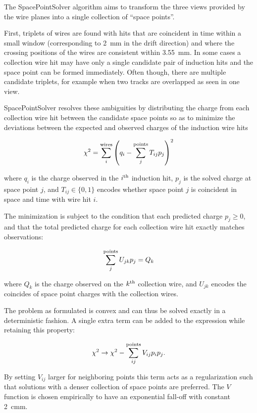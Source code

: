 The SpacePointSolver algorithm aims to transform the three \twod views provided by the wire planes into a single collection of \threed ``space points''.

First, triplets of wires are found with hits that are coincident in time within a small window (corresponding to \SI{2}{mm} in the drift direction) and where the crossing positions of the wires are consistent within \SI{3.55}{mm}. In some cases a collection wire hit may have only a single candidate pair of induction hits and the space point can be formed immediately. Often though, there are multiple candidate triplets, for example when two tracks are overlapped as seen in one view.

SpacePointSolver resolves these ambiguities by distributing the charge from each collection wire hit between the candidate space points so as to minimize the deviations between the expected and observed charges of the induction wire hits

\begin{equation}
\chi^2 = \sum_i^{\rm wires} \left(q_i - \sum_j^{\rm points}T_{ij}p_j\right)^2
\end{equation}

where $q_i$ is the charge observed in the $i^{\rm th}$ induction hit, $p_j$ is the solved charge at space point $j$, and $T_{ij}\in\{0,1\}$ encodes whether space point $j$ is coincident in space and time with wire hit $i$.

The minimization is subject to the condition that each predicted charge $p_j\ge0$, and that the total predicted charge for each collection wire hit exactly matches observations:

\begin{equation}
\sum_j^{\rm points}U_{jk}p_j=Q_k
\end{equation}

where $Q_k$ is the charge observed on the $k^{\rm th}$ collection wire, and $U_{jk}$ encodes the coincides of space point charges with the collection wires.

The problem as formulated is convex and can thus be solved exactly in a deterministic fashion. A single extra term can be added to the expression while retaining this property:

\begin{equation}
\chi^2 \to \chi^2 - \sum_{ij}^{\rm points}V_{ij}p_ip_j .
\end{equation}

By setting $V_{ij}$ larger for neighboring points this term acts as a regularization such that solutions with a denser collection of space points are preferred. The $V$ function is chosen empirically to have an exponential fall-off with constant \SI{2}{cm}m. 

